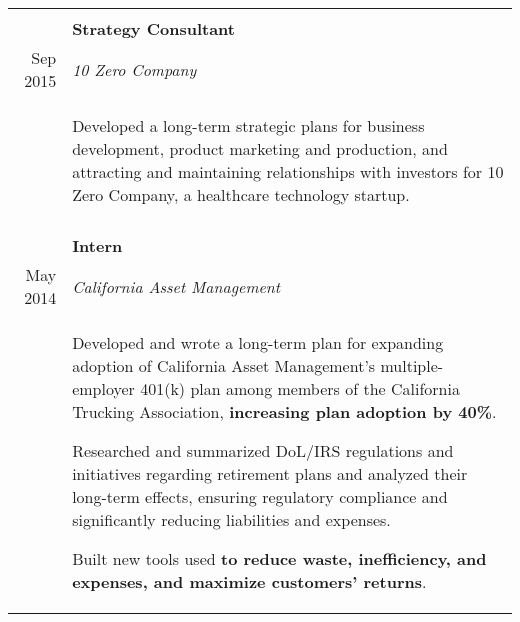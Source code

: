 \documentclass[10pt]{article}
\newcommand{\afterlistspace}[0]{\vspace{-1.5em}}
\begin{document}
\begin{tabular}{r|p{16cm}}
    \\
    \multicolumn{2}{c}{}
    \\
    
\begin{comment}

    Dec 2015 & \textbf{Strategy Consultant}
    \\
    Sep 2015 & \emph{10 Zero Company}
    \\
    & \begin{itemize}
        \footnotesize{
            \item Developed a long-term strategic plans for business development, product marketing and production, and attracting and maintaining relationships with investors for 10 Zero Company, a healthcare technology startup.
        }
        \afterlistspace
    \end{itemize}

    \\
    \multicolumn{2}{c}{}
    \\

\end{comment}

    Aug 2014 & \textbf{Intern}
    \\
    May 2014 & \emph{California Asset Management}
    \\
    & \begin{itemize}
        \footnotesize{

            \item Developed and wrote a long-term plan for expanding adoption of California Asset Management's multiple-employer 401(k) plan among members of the California Trucking Association, \textbf{increasing plan adoption by 40\%}.
            
            \item Researched and summarized DoL/IRS regulations and initiatives regarding retirement plans
            and analyzed their long-term effects, ensuring regulatory compliance and significantly reducing liabilities and expenses.
            
            \item Built new tools used \textbf{to reduce waste, inefficiency, and expenses, and maximize customers' returns}.
        
        }

        \afterlistspace
    \end{itemize}

\end{tabular}
\end{document}
